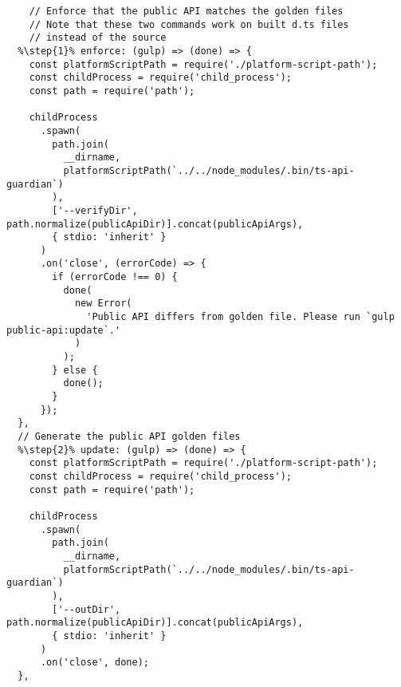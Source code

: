\begin{verbatim}
    // Enforce that the public API matches the golden files
    // Note that these two commands work on built d.ts files
    // instead of the source
  %\step{1}% enforce: (gulp) => (done) => {
    const platformScriptPath = require('./platform-script-path');
    const childProcess = require('child_process');
    const path = require('path');

    childProcess
      .spawn(
        path.join(
          __dirname,
          platformScriptPath(`../../node_modules/.bin/ts-api-guardian`)
        ),
        ['--verifyDir', path.normalize(publicApiDir)].concat(publicApiArgs),
        { stdio: 'inherit' }
      )
      .on('close', (errorCode) => {
        if (errorCode !== 0) {
          done(
            new Error(
              'Public API differs from golden file. Please run `gulp public-api:update`.'
            )
          );
        } else {
          done();
        }
      });
  },
  // Generate the public API golden files
  %\step{2}% update: (gulp) => (done) => {
    const platformScriptPath = require('./platform-script-path');
    const childProcess = require('child_process');
    const path = require('path');

    childProcess
      .spawn(
        path.join(
          __dirname,
          platformScriptPath(`../../node_modules/.bin/ts-api-guardian`)
        ),
        ['--outDir', path.normalize(publicApiDir)].concat(publicApiArgs),
        { stdio: 'inherit' }
      )
      .on('close', done);
  },
\end{verbatim}
